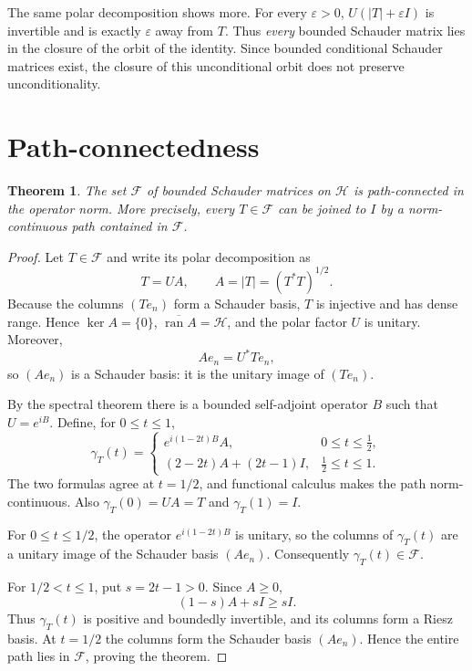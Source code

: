 \documentclass[11pt]{article}
\newtheorem{theorem}{Theorem}
\newcommand{\Hh}{\mathcal H}
\newcommand{\Ff}{\mathcal F}
\begin{document}
The same polar decomposition shows more.  For every $\varepsilon>0$,
$U(|T|+\varepsilon I)$ is invertible and is exactly $\varepsilon$ away from
$T$.  Thus \emph{every} bounded Schauder matrix lies in the closure of the
orbit of the identity.  Since bounded conditional Schauder matrices exist,
the closure of this unconditional orbit does not preserve unconditionality.

\section{Path-connectedness}

\begin{theorem}\label{thm:path}
The set $\Ff$ of bounded Schauder matrices on $\Hh$ is path-connected in the
operator norm.  More precisely, every $T\in\Ff$ can be joined to $I$ by a
norm-continuous path contained in $\Ff$.
\end{theorem}

\begin{proof}
Let $T\in\Ff$ and write its polar decomposition as
\[
 T=UA,\qquad A=|T|=(T^*T)^{1/2}.
\]
Because the columns $(Te_n)$ form a Schauder basis, $T$ is injective and has
dense range.  Hence $\ker A=\{0\}$, $\overline{\operatorname{ran}A}=\Hh$,
and the polar factor $U$ is unitary.  Moreover,
\[
 Ae_n=U^*Te_n,
\]
so $(Ae_n)$ is a Schauder basis: it is the unitary image of $(Te_n)$.

By the spectral theorem there is a bounded self-adjoint operator $B$ such
that $U=e^{iB}$.  Define, for $0\le t\le1$,
\[
 \gamma_T(t)=
 \begin{cases}
   e^{i(1-2t)B}A, & 0\le t\le\tfrac12,\\[2mm]
   (2-2t)A+(2t-1)I, & \tfrac12\le t\le1.
 \end{cases}
\]
The two formulas agree at $t=1/2$, and functional calculus makes the path
norm-continuous.  Also $\gamma_T(0)=UA=T$ and $\gamma_T(1)=I$.

For $0\le t\le1/2$, the operator $e^{i(1-2t)B}$ is unitary, so the columns
of $\gamma_T(t)$ are a unitary image of the Schauder basis $(Ae_n)$.
Consequently $\gamma_T(t)\in\Ff$.

For $1/2<t\le1$, put $s=2t-1>0$.  Since $A\ge0$,
\[
 (1-s)A+sI\ge sI.
\]
Thus $\gamma_T(t)$ is positive and boundedly invertible, and its columns
form a Riesz basis.  At $t=1/2$ the columns form the Schauder basis
$(Ae_n)$.  Hence the entire path lies in $\Ff$, proving the theorem.
\end{proof}
\end{document}
